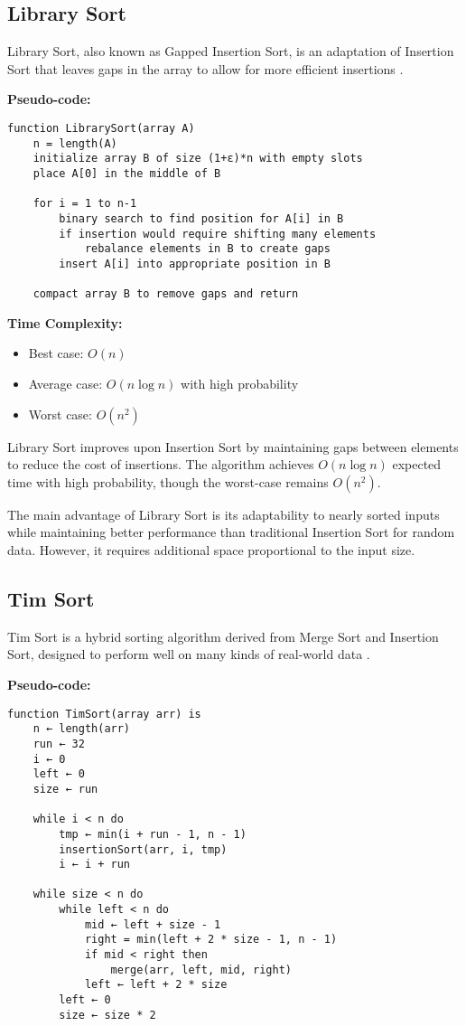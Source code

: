 \documentclass[sigconf]{acmart}
\begin{document}
\subsection{Library Sort}
Library Sort, also known as Gapped Insertion Sort, is an adaptation of Insertion Sort that leaves gaps in the array to allow for more efficient insertions \cite{librarysort, bender2006insertion}.

\textbf{Pseudo-code:}
\begin{verbatim}
function LibrarySort(array A)
    n = length(A)
    initialize array B of size (1+ε)*n with empty slots
    place A[0] in the middle of B
    
    for i = 1 to n-1
        binary search to find position for A[i] in B
        if insertion would require shifting many elements
            rebalance elements in B to create gaps
        insert A[i] into appropriate position in B
    
    compact array B to remove gaps and return
\end{verbatim}

\textbf{Time Complexity:}
\begin{itemize}
    \item Best case: $O(n)$
    \item Average case: $O(n \log n)$ with high probability
    \item Worst case: $O(n^2)$
\end{itemize}

Library Sort improves upon Insertion Sort by maintaining gaps between elements to reduce the cost of insertions. The algorithm achieves $O(n \log n)$ expected time with high probability, though the worst-case remains $O(n^2)$.

The main advantage of Library Sort is its adaptability to nearly sorted inputs while maintaining better performance than traditional Insertion Sort for random data. However, it requires additional space proportional to the input size.

\subsection{Tim Sort}
Tim Sort is a hybrid sorting algorithm derived from Merge Sort and Insertion Sort, designed to perform well on many kinds of real-world data \cite{timsort}.

\textbf{Pseudo-code:}
\begin{verbatim}
function TimSort(array arr) is
    n ← length(arr) 
    run ← 32
    i ← 0 
    left ← 0
    size ← run

    while i < n do
        tmp ← min(i + run - 1, n - 1)
        insertionSort(arr, i, tmp) 
        i ← i + run

    while size < n do 
        while left < n do
            mid ← left + size - 1 
            right = min(left + 2 * size - 1, n - 1) 
            if mid < right then
                merge(arr, left, mid, right) 
            left ← left + 2 * size
        left ← 0
        size ← size * 2
\end{verbatim}
\end{document}
